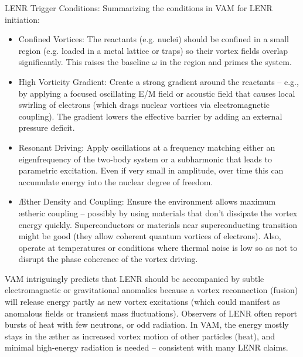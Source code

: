 LENR Trigger Conditions: Summarizing the conditions in VAM for LENR initiation:


\begin{itemize}

\item 
Confined Vortices: The reactants (e.g. nuclei) should be confined in a small region (e.g. loaded in a metal lattice or traps) so their vortex fields overlap significantly. This raises the baseline $\omega$ in the region and primes the system.




\item 
High Vorticity Gradient: Create a strong gradient around the reactants – e.g., by applying a focused oscillating E/M field or acoustic field that causes local swirling of electrons (which drags nuclear vortices via electromagnetic coupling). The gradient lowers the effective barrier by adding an external pressure deficit.




\item 
Resonant Driving: Apply oscillations at a frequency matching either an eigenfrequency of the two-body system or a subharmonic that leads to parametric excitation. Even if very small in amplitude, over time this can accumulate energy into the nuclear degree of freedom.




\item 
Æther Density and Coupling: Ensure the environment allows maximum ætheric coupling – possibly by using materials that don’t dissipate the vortex energy quickly. Superconductors or materials near superconducting transition might be good (they allow coherent quantum vortices of electrons). Also, operate at temperatures or conditions where thermal noise is low so as not to disrupt the phase coherence of the vortex driving.




\end{itemize}

VAM intriguingly predicts that LENR should be accompanied by subtle electromagnetic or gravitational anomalies because a vortex reconnection (fusion) will release energy partly as new vortex excitations (which could manifest as anomalous fields or transient mass fluctuations). Observers of LENR often report bursts of heat with few neutrons, or odd radiation. In VAM, the energy mostly stays in the æther as increased vortex motion of other particles (heat), and minimal high-energy radiation is needed – consistent with many LENR claims.


